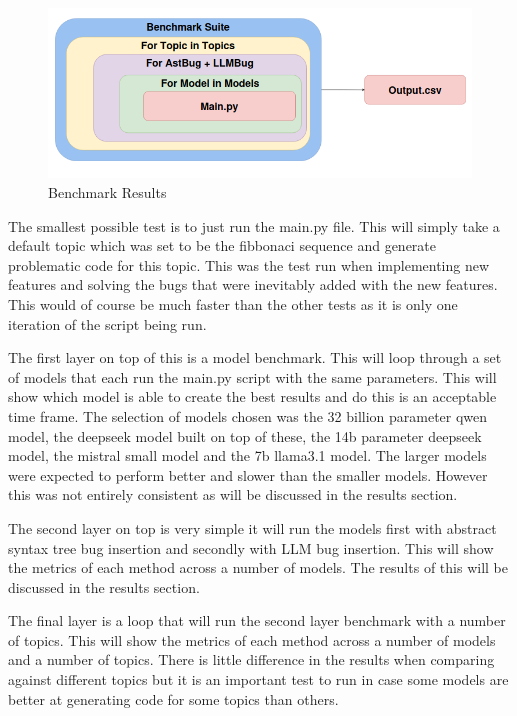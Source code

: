 \documentclass[12pt]{extarticle}
\begin{document}
\begin{figure}[h!]
\centering
\includegraphics[width=\linewidth]{Images/Benchmark.png}
\caption{Benchmark Results}
\label{fig:benchmark_results}
\end{figure}

The smallest possible test is to just run the main.py file. This will simply take a default topic which was set to be the fibbonaci sequence and generate problematic code for this topic. This was the test run when implementing new features and solving the bugs that were inevitably added with the new features. This would of course be much faster than the other tests as it is only one iteration of the script being run.

The first layer on top of this is a model benchmark. This will loop through a set of models that each run the main.py script with the same parameters. This will show which model is able to create the best results and do this is an acceptable time frame. The selection of models chosen was the 32 billion parameter qwen model, the deepseek model built on top of these, the 14b parameter deepseek model, the mistral small model and the 7b llama3.1 model. The larger models were expected to perform better and slower than the smaller models. However this was not entirely consistent as will be discussed in the results section.

The second layer on top is very simple it will run the models first with abstract syntax tree bug insertion and secondly with LLM bug insertion. This will show the metrics of each method across a number of models. The results of this will be discussed in the results section.

The final layer is a loop that will run the second layer benchmark with a number of topics. This will show the metrics of each method across a number of models and a number of topics. There is little difference in the results when comparing against different topics but it is an important test to run in case some models are better at generating code for some topics than others.
\end{document}
